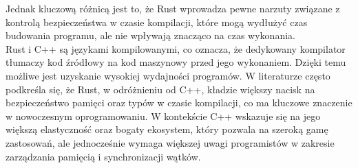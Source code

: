Jednak kluczową różnicą jest to, że Rust wprowadza pewne narzuty związane z kontrolą bezpieczeństwa w czasie kompilacji, które mogą wydłużyć czas budowania programu, ale nie wpływają znacząco na czas wykonania.\\
Rust i C++ są językami kompilowanymi, co oznacza, że dedykowany kompilator tłumaczy kod źródłowy na kod maszynowy przed jego wykonaniem. Dzięki temu możliwe jest uzyskanie wysokiej wydajności programów. W literaturze \cite{Lesiński} często podkreśla się, że Rust, w odróżnieniu od C++, kładzie większy nacisk na bezpieczeństwo pamięci oraz typów w czasie kompilacji, co ma kluczowe znaczenie w nowoczesnym oprogramowaniu. W kontekście C++ wskazuje się na jego większą elastyczność oraz bogaty ekosystem, który pozwala na szeroką gamę zastosowań, ale jednocześnie wymaga większej uwagi programistów w zakresie zarządzania pamięcią i synchronizacji wątków.
